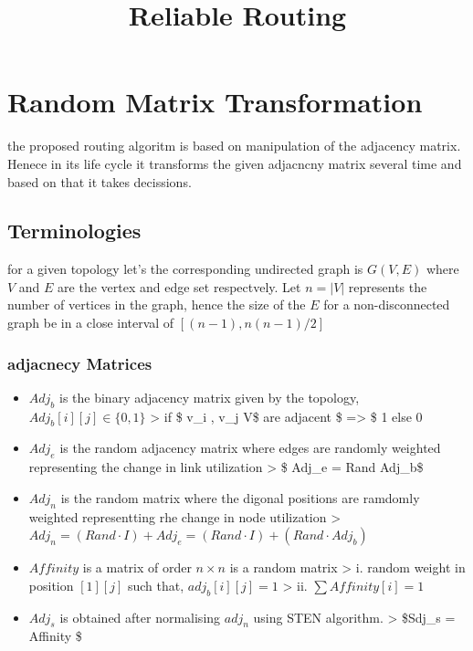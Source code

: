 \documentclass[11pt]{article}
\title{Reliable Routing }
\providecommand{\tightlist}{%
      \setlength{\itemsep}{0pt}\setlength{\parskip}{0pt}}
\begin{document}
    
    
    \maketitle
    
    

    
    \section{Random Matrix
Transformation}\label{random-matrix-transformation}

the proposed routing algoritm is based on manipulation of the adjacency
matrix. Henece in its life cycle it transforms the given adjacncny
matrix several time and based on that it takes decissions.

\subsection{Terminologies}\label{terminologies}

for a given topology let's the corresponding undirected graph is
\(G(V,E)\) where \(V\) and \(E\) are the vertex and edge set
respectvely. Let \(n=|V|\) represents the number of vertices in the
graph, hence the size of the \(E\) for a non-disconnected graph be in a
close interval of \([(n-1) , n(n-1)/2]\)

\subsubsection{adjacnecy Matrices}\label{adjacnecy-matrices}

\begin{itemize}
\tightlist
\item
  \(Adj_b\) is the binary adjacency matrix given by the topology,
  \(Adj_b[i][j] \in \{0,1\}\) \textgreater{} if \$ v\_i , v\_j \in V\$
  are adjacent \$ =\textgreater{} \$ 1 else 0
\item
  \(Adj_e\) is the random adjacency matrix where edges are randomly
  weighted representing the change in link utilization \textgreater{} \$
  Adj\_e = Rand \cdot Adj\_b\$
\item
  \(Adj_n\) is the random matrix where the digonal positions are
  ramdomly weighted representting rhe change in node utilization
  \textgreater{}
  \(Adj_n = (Rand \cdot I) + Adj_e = (Rand \cdot I) + (Rand \cdot Adj_b)\)
\item
  \(Affinity\) is a matrix of order \(n \times n\) is a random matrix
  \textgreater{} i. random weight in position \([1][j]\) such that,
  \(adj_b[i][j] = 1\) \textgreater{} ii. \(\sum Affinity[i] = 1\)
\item
  \(Adj_s\) is obtained after normalising \(adj_n\) using STEN
  algorithm. \textgreater{} \$Sdj\_s = Affinity \cdot \$
\end{itemize}
\end{document}
